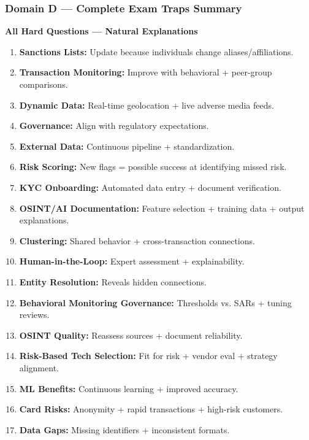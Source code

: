 \documentclass[12pt,aspectratio=169]{beamer}
\renewcommand{\scriptsize}{\fontsize{4.5}{5.5}\selectfont}
\begin{document}
	\begin{frame}
		\frametitle{\fontsize{11}{13}\selectfont \textbf{Domain D — Complete Exam Traps Summary}}
		\scriptsize
		\begin{block}{\fontsize{7}{9}\selectfont \textbf{All Hard Questions — Natural Explanations}}
			\scriptsize
			\begin{enumerate}
				\item \textbf{Sanctions Lists:} Update because individuals change aliases/affiliations.
				\item \textbf{Transaction Monitoring:} Improve with behavioral + peer-group comparisons.
				\item \textbf{Dynamic Data:} Real-time geolocation + live adverse media feeds.
				\item \textbf{Governance:} Align with regulatory expectations.
				\item \textbf{External Data:} Continuous pipeline + standardization.
				\item \textbf{Risk Scoring:} New flags = possible success at identifying missed risk.
				\item \textbf{KYC Onboarding:} Automated data entry + document verification.
				\item \textbf{OSINT/AI Documentation:} Feature selection + training data + output explanations.
				\item \textbf{Clustering:} Shared behavior + cross-transaction connections.
				\item \textbf{Human-in-the-Loop:} Expert assessment + explainability.
				\item \textbf{Entity Resolution:} Reveals hidden connections.
				\item \textbf{Behavioral Monitoring Governance:} Thresholds vs. SARs + tuning reviews.
				\item \textbf{OSINT Quality:} Reassess sources + document reliability.
				\item \textbf{Risk-Based Tech Selection:} Fit for risk + vendor eval + strategy alignment.
				\item \textbf{ML Benefits:} Continuous learning + improved accuracy.
				\item \textbf{Card Risks:} Anonymity + rapid transactions + high-risk customers.
				\item \textbf{Data Gaps:} Missing identifiers + inconsistent formats.

\end{enumerate}
\end{block}
\end{frame}
\end{document}
